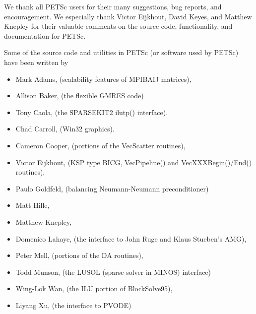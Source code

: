 %
%

\medskip \medskip \noindent
We thank all PETSc users for their many suggestions, bug reports, and
encouragement.  We especially thank Victor Eijkhout, David Keyes, and
Matthew Knepley for their valuable comments on the source code,
functionality, and documentation for PETSc.


\vspace{.3in}
\noindent
Some of the source code and utilities in PETSc (or software used by PETSc)
have been written by 
\begin{itemize}
  \item Mark Adams, (scalability features of MPIBAIJ matrices),
  \item Allison Baker, (the flexible GMRES code)
  \item Tony Caola, (the SPARSEKIT2 ilutp() interface).
  \item Chad Carroll, (Win32 graphics).
  \item Cameron Cooper, (portions of the VecScatter routines), 
  \item Victor Eijkhout, (KSP type BICG, VecPipeline() and VecXXXBegin()/End() routines), 
  \item Paulo Goldfeld, (balancing Neumann-Neumann preconditioner)
  \item Matt Hille, 
  \item Matthew Knepley,
  \item Domenico Lahaye, (the interface to John Ruge and Klaus Stueben's AMG),
  \item Peter Mell, (portions of the DA routines),
  \item Todd Munson, (the LUSOL (sparse solver in MINOS) interface)
  \item Wing-Lok Wan, (the ILU portion of BlockSolve95),
  \item Liyang Xu, (the interface to PVODE)
\end{itemize}

